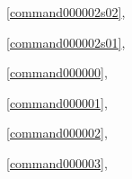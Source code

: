 ﻿



\noindent\commandnumbernameone\ \ref{command000002s02},\ \pageref{command000002s02}%

\noindent\commandnumbernameone\ \ref{command000002s01},\ \pageref{command000002s01}%

\noindent\commandnumbernameone\ \ref{command000000},\ \pageref{command000000}%

\noindent\commandnumbernameone\ \ref{command000001},\ \pageref{command000001}%

\noindent\commandnumbernameone\ \ref{command000002},\ \pageref{command000002}%

\noindent\commandnumbernameone\ \ref{command000003},\ \pageref{command000003}%









